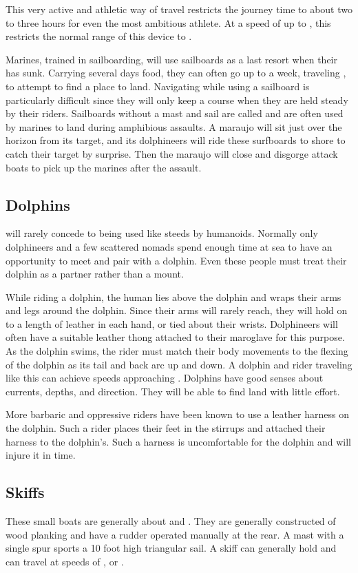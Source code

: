 \begin{multicols*}{2}
This very active and athletic way of travel restricts the journey time to about two to three hours for even the most ambitious athlete. At a speed of up to , this restricts the normal range of this device to .

Marines, trained in sailboarding, will use sailboards as a last resort when their  has sunk. Carrying several days food, they can often go up to a week, traveling , to attempt to find a place to land. Navigating while using a sailboard is particularly difficult since they will only keep a course when they are held steady by their riders.
Sailboards without a mast and sail are called  and are often used by marines to land during amphibious assaults. A maraujo will sit just over the horizon from its target, and its dolphineers will ride these surfboards to shore to catch their target by surprise. Then the maraujo will close and disgorge attack boats to pick up the marines after the assault.
\subsection{Dolphins}
 will rarely concede to being used like steeds by humanoids. Normally only dolphineers and a few scattered nomads spend enough time at sea to have an opportunity to meet and pair with a dolphin. Even these people must treat their dolphin as a partner rather than a mount.

While riding a dolphin, the human lies above the dolphin and wraps their arms and legs around the dolphin. Since their arms will rarely reach, they will hold on to a length of leather in each hand, or tied about their wrists. Dolphineers will often have a suitable leather thong attached to their maroglave for this purpose. As the dolphin swims, the rider must match their body movements to the flexing of the dolphin as its tail and back arc up and down. A dolphin and rider traveling like this can achieve speeds approaching . Dolphins have good senses about currents, depths, and direction. They will be able to find land with little effort.

More barbaric and oppressive riders have been known to use a leather harness on the dolphin. Such a rider places their feet in the stirrups and attached their harness to the dolphin's. Such a harness is uncomfortable for the dolphin and will injure it in time.
\subsection{Skiffs}
These small boats are generally about  and . They are generally constructed of wood planking and have a rudder operated manually at the rear. A mast with a single spur sports a 10 foot high triangular sail. A skiff can generally hold  and can travel at speeds of , or .


\end{multicols*}
